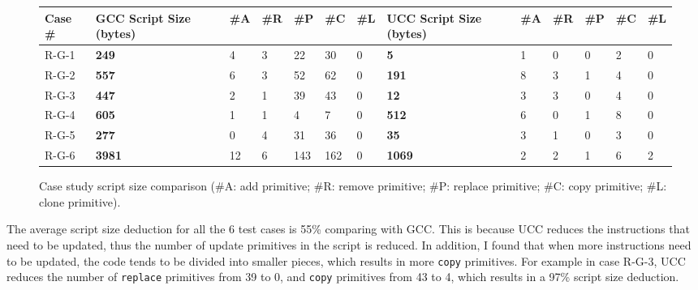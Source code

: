 \begin{figure}[htbp]
\begin{center}
\begin{small}
\begin{tabular}{||p{0.5in}||p{0.38in}|p{0.15in} p{0.15in} p{0.2in} p{0.2in} p{0.15in}||
                           p{0.38in}|p{0.15in} p{0.15in} p{0.2in} p{0.2in} p{0.15in}||} \hline

Case \# & GCC Script Size (bytes) & \#A & \#R & \#P & \#C & \#L &  
          UCC Script Size (bytes) & \#A & \#R & \#P & \#C & \#L  \\ \hline \hline

R-G-1 &  \bf249 & 4&3&22&30&0    &\bf5  & 1&0&0&2&0  \\  \hline
R-G-2 &  \bf557 & 6&3&52&62&0    &\bf191& 8&3&1&4&0  \\  \hline
R-G-3 &  \bf447 & 2&1&39&43&0    &\bf12 &3&3&0&4&0   \\  \hline
R-G-4 &  \bf605 & 1&1& 4& 7&0    &\bf512 &6&0&1&8&0  \\  \hline
R-G-5 &  \bf277 & 0&4&31&36&0    &\bf35 &3&1&0&3&0  \\  \hline
R-G-6 &  \bf3981& 12&6&143&162&0 &\bf1069 &2&2&1&6&2 \\  \hline

\end{tabular}
\end{small}
\end{center}
\caption{Case study script size comparison (\#A: add primitive; \#R: remove primitive; \#P: replace primitive; \#C: copy primitive; \#L: clone primitive).}
\label{fdeluge.data}
\end{figure}

The average script size deduction for all the 6 test cases is 55\% comparing with GCC. This is because UCC reduces the instructions that need to be updated, thus the number of update primitives in the script is reduced. In addition, I found that when more instructions need to be updated, the code tends to be divided into smaller pieces, which results in more {\tt copy} primitives. For example in case R-G-3, UCC reduces the number of {\tt replace} primitives from 39 to 0, and {\tt copy} primitives from 43 to 4, which results in a 97\% script size deduction.

